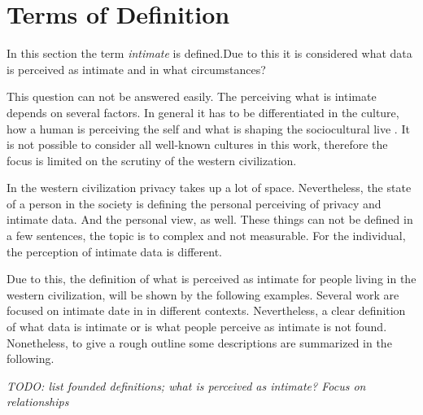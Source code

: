 \section{Terms of Definition}
\label{sec:terms_of_definition}
In this section the term \textit{intimate} is defined.Due to this it is considered what data is perceived as intimate and in what circumstances?

This question can not be answered easily. The perceiving what is intimate depends on several factors.
In general it has to be differentiated in the culture, how a human is perceiving the self and what is shaping the sociocultural live \cite{carrithers1985category}. It is not possible to consider all well-known cultures in this work, therefore the focus is limited on the scrutiny of the western civilization. 

In the western civilization privacy takes up a lot of space. Nevertheless, the state of a person in the society is defining the personal perceiving of privacy and intimate data. And the personal view, as well.
These things can not be defined in a few sentences, the topic is to complex and not measurable. For the individual, the perception of intimate data is different.

Due to this, the definition of what is perceived as intimate for people living in the western civilization, will be shown by the following examples. Several work are focused on intimate date in in different contexts. Nevertheless, a clear definition of what data is intimate or is what people perceive as intimate is not found.
Nonetheless, to give a rough outline some descriptions are summarized in the following.

\textit{TODO: list founded definitions; what is perceived as intimate? Focus on relationships}